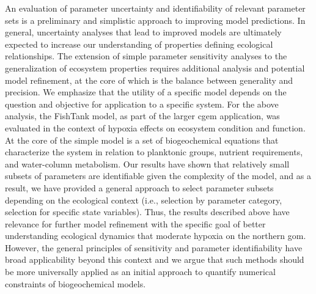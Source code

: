 \documentclass[letterpaper,12pt,oneside]{article}\usepackage[]{graphicx}\usepackage[]{color}
\begin{document}
An evaluation of parameter uncertainty and identifiability of relevant parameter sets is a preliminary and simplistic approach to improving model predictions.  In general, uncertainty analyses that lead to improved models are ultimately expected to increase our understanding of properties defining ecological relationships.  The extension of simple parameter sensitivity analyses to the generalization of ecosystem properties requires additional analysis and potential model refinement, at the core of which is the balance between generality and precision. We emphasize that the utility of a specific model depends on the question and objective for application to a specific system.  For the above analysis, the FishTank model, as part of the larger \ac{cgem} application, was evaluated in the context of hypoxia effects on ecosystem condition and function.  At the core of the simple model is a set of biogeochemical equations that characterize the system in relation to planktonic groups, nutrient requirements, and water-column metabolism.  Our results have shown that relatively small subsets of parameters are identifiable given the complexity of the model, and as a result, we have provided a general approach to select parameter subsets depending on the ecological context (i.e., selection by parameter category, selection for specific state variables).  Thus, the results described above have relevance for further model refinement with the specific goal of better understanding ecological dynamics that moderate hypoxia on the northern \ac{gom}.  However, the general principles of sensitivity and parameter identifiability have broad applicability beyond this context and we argue that such methods should be more universally applied as an initial approach to quantify numerical constraints of biogeochemical models.  
\end{document}
